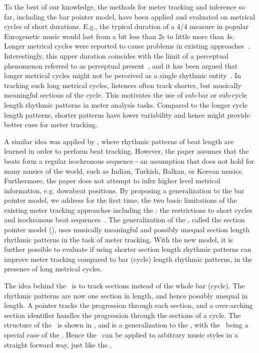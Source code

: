 To the best of our knowledge, the methods for meter tracking and inference so far, including the bar pointer model, have been applied and evaluated on metrical cycles of short durations. E.g., the typical duration of a 4/4 measure in popular Eurogenetic music would last from a bit less than 2s to little more than 4s. Longer metrical cycles were reported to cause problems in existing approaches~\cite{holzapfel:14:odd}. Interestingly, this upper duration coincides with the limit of a perceptual phenomenon referred to as perceptual present~\cite{clarke:99:percpresent}, and it has been argued that longer metrical cycles might not be perceived as a single rhythmic entity~\cite{clayton:00:time}. In tracking such long metrical cycles, listeners often track shorter, but musically meaningful sections of the cycle. This motivates the use of sub-bar or sub-cycle length rhythmic patterns in meter analysis tasks. Compared to the longer cycle length patterns, shorter patterns have lower variability and hence might provide better cues for meter tracking.

A similar idea was applied by , where rhythmic patterns of beat length are learned in order to perform beat tracking. However, the paper assumes that the beats form a regular isochronous sequence - an assumption that does not hold for many musics of the world, such as Indian, Turkish, Balkan, or Korean musics. Furthermore, the paper does not attempt to infer higher level metrical information, e.g. downbeat positions. By proposing a generalization to the bar pointer model, we address for the first time, the two basic limitations of the existing meter tracking approaches including the \bpmodel: the restrictions to short cycles and isochronous beat sequences~\cite{ajay:16:spmodel}. The generalization of the \bpmodel, called the section pointer model (\spmodel), uses musically meaningful and possibly unequal section length rhythmic patterns in the task of meter tracking. With the new model, it is further possible to evaluate if using shorter section length rhythmic patterns can improve meter tracking compared to bar (cycle) length rhythmic patterns, in the presence of long metrical cycles. 

The idea behind the \spmodel\ is to track sections instead of the whole bar (cycle). The rhythmic patterns are now one section in length, and hence possibly unequal in length. A pointer tracks the progression through each section, and a over-arching section identifier handles the progression through the sections of a cycle. The structure of the \spmodel\ is shown in , and is a generalization to the \bpmodel, with the \bpmodel\ being a special case of the \spmodel. Hence the \spmodel\ can be applied to arbitrary music styles in a straight forward way, just like the \bpmodel.


